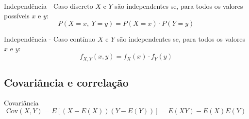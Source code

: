 \documentclass[a4paper,12pt]{article}
\begin{document}
\begin{formulabox}{Independência - Caso discreto}
$X$ e $Y$ são independentes se, para todos os valores possíveis $x$ e $y$:
\begin{equation}\label{formula18}\tag{Fórmula 18}
    P(X = x,\ Y = y) = P(X = x) \cdot P(Y = y)
\end{equation}
\end{formulabox}

\begin{formulabox}{Independência - Caso contínuo}
$X$ e $Y$ são independentes se, para todos os valores $x$ e $y$:
\begin{equation}\label{formula19}\tag{Fórmula 19}
    f_{X,Y}(x, y) = f_X(x) \cdot f_Y(y)
\end{equation}
\end{formulabox}

\subsection{Covariância e correlação}

\begin{formulabox}{Covariância}
\begin{equation}\label{formula20}\tag{Fórmula 20}
    \mathrm{Cov}(X, Y) = E[(X - E(X))(Y - E(Y))] = E(XY) - E(X)E(Y)
\end{equation}
\end{formulabox}
\end{document}
